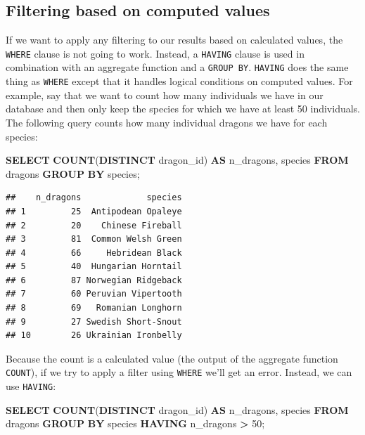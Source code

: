 \documentclass[
]{book}
\newenvironment{Shaded}{\begin{snugshade}}{\end{snugshade}}
\newcommand{\DecValTok}[1]{\textcolor[rgb]{0.00,0.00,0.81}{#1}}
\newcommand{\FunctionTok}[1]{\textcolor[rgb]{0.13,0.29,0.53}{\textbf{#1}}}
\newcommand{\KeywordTok}[1]{\textcolor[rgb]{0.13,0.29,0.53}{\textbf{#1}}}
\newcommand{\NormalTok}[1]{#1}
\newcommand{\OperatorTok}[1]{\textcolor[rgb]{0.81,0.36,0.00}{\textbf{#1}}}
\begin{document}
\hypertarget{filtering-based-on-computed-values}{%
\subsection{Filtering based on computed values}\label{filtering-based-on-computed-values}}

If we want to apply any filtering to our results based on calculated values, the
\texttt{WHERE} clause is not going to work. Instead, a \texttt{HAVING} clause is used in
combination with an aggregate function and a \texttt{GROUP\ BY}. \texttt{HAVING} does the same
thing as \texttt{WHERE} except that it handles logical conditions on computed values.
For example, say that we want to count how many individuals we have in our
database and then only keep the species for which we have at least 50 individuals.
The following query counts how many individual dragons we have for each species:

\begin{Shaded}
\begin{Highlighting}[]
\KeywordTok{SELECT} \FunctionTok{COUNT}\NormalTok{(}\KeywordTok{DISTINCT}\NormalTok{ dragon\_id) }\KeywordTok{AS}\NormalTok{ n\_dragons, species}
\KeywordTok{FROM}\NormalTok{ dragons}
\KeywordTok{GROUP} \KeywordTok{BY}\NormalTok{ species;}
\end{Highlighting}
\end{Shaded}

\begin{verbatim}
##    n_dragons             species
## 1         25  Antipodean Opaleye
## 2         20    Chinese Fireball
## 3         81  Common Welsh Green
## 4         66     Hebridean Black
## 5         40  Hungarian Horntail
## 6         87 Norwegian Ridgeback
## 7         60 Peruvian Vipertooth
## 8         69   Romanian Longhorn
## 9         27 Swedish Short-Snout
## 10        26 Ukrainian Ironbelly
\end{verbatim}

Because the count is a calculated value (the output of the aggregate function
\texttt{COUNT}), if we try to apply a filter using \texttt{WHERE} we'll get an error. Instead, we can use \texttt{HAVING}:

\begin{Shaded}
\begin{Highlighting}[]
\KeywordTok{SELECT} \FunctionTok{COUNT}\NormalTok{(}\KeywordTok{DISTINCT}\NormalTok{ dragon\_id) }\KeywordTok{AS}\NormalTok{ n\_dragons, species}
\KeywordTok{FROM}\NormalTok{ dragons}
\KeywordTok{GROUP} \KeywordTok{BY}\NormalTok{ species}
\KeywordTok{HAVING}\NormalTok{ n\_dragons }\OperatorTok{\textgreater{}} \DecValTok{50}\NormalTok{;}
\end{Highlighting}
\end{Shaded}
\end{document}
